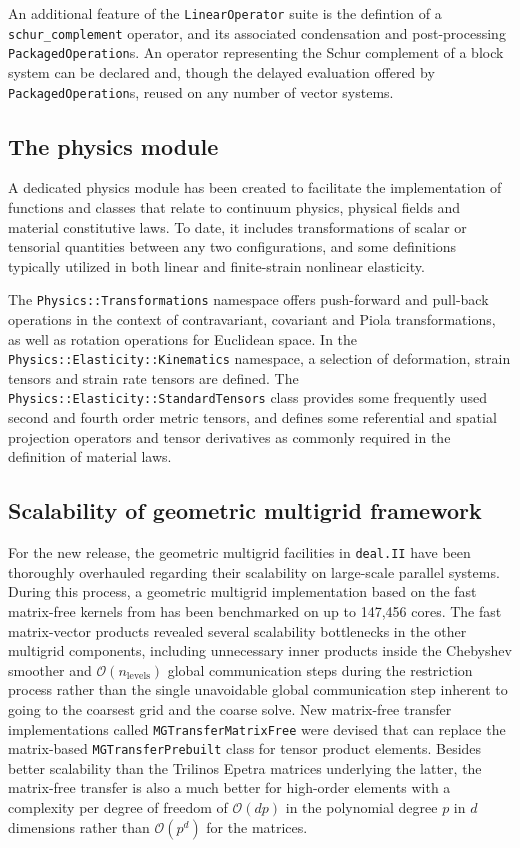 \documentclass{ansarticle-preprint}
\newcommand{\specialword}[1]{\texttt{#1}}
\newcommand{\dealii}{{\specialword{deal.II}}}
\begin{document}
An additional feature of the \texttt{LinearOperator} suite is the defintion of a \texttt{schur\_complement} operator, and its associated condensation and post-processing \texttt{PackagedOperation}s.
An operator representing the Schur complement of a block system can be declared and, though the delayed evaluation offered by \texttt{PackagedOperation}s, reused on any number of vector systems.

\subsection{The physics module}

A dedicated physics module has been created to facilitate the implementation of functions and classes that relate to continuum physics, physical fields and material constitutive laws.
To date, it includes transformations of scalar or tensorial quantities between any two configurations, and some definitions typically utilized in both linear and finite-strain nonlinear elasticity.

The \verb!Physics::Transformations! namespace offers push-forward and pull-back operations in the context of contravariant, covariant and Piola transformations, as well as rotation operations for Euclidean space.
In the \verb!Physics::Elasticity::Kinematics! namespace, a selection of deformation, strain tensors and strain rate tensors are defined.
The \verb!Physics::Elasticity::StandardTensors! class provides some frequently used second and fourth order metric tensors, and defines some referential and spatial projection operators and tensor derivatives as commonly required in the definition of material laws.

\subsection{Scalability of geometric multigrid framework}

For the new release, the geometric multigrid facilities in \dealii{} have been
thoroughly overhauled regarding their scalability on large-scale parallel
systems. During this process, a geometric multigrid implementation based on
the fast matrix-free kernels from \cite{KronbichlerKormann2012} has been
benchmarked on up to 147,456 cores. The fast matrix-vector products revealed
several scalability bottlenecks in the other multigrid components, including
unnecessary inner products inside the Chebyshev smoother and
$\mathcal O(n_\text{levels})$ global communication steps during the
restriction process rather than the single unavoidable global communication
step inherent to going to the coarsest grid and the coarse solve. New
matrix-free transfer implementations called \texttt{MGTransferMatrixFree} were
devised that can replace the matrix-based \texttt{MGTransferPrebuilt} class
for tensor product elements. Besides better scalability than the Trilinos
Epetra matrices underlying the latter, the matrix-free transfer is also a much
better for high-order elements with a complexity per degree of freedom of
$\mathcal O(d p)$ in the polynomial degree $p$ in $d$ dimensions rather than
$\mathcal O(p^d)$ for the matrices.
\end{document}
